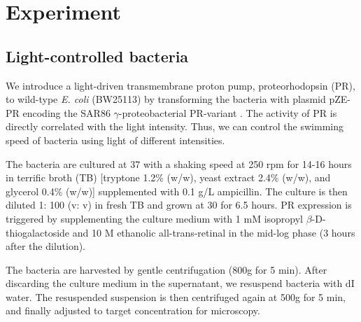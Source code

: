 \documentclass[twocolumn,aps,pre,amsmath,amssymb,floatfix,longbibliography]{revtex4-1}
\begin{document}


\section{Experiment}

\subsection{Light-controlled bacteria}
We introduce a light-driven transmembrane proton pump, proteorhodopsin (PR), to wild-type \textit{E. coli} (BW25113) by transforming the bacteria with plasmid pZE-PR encoding the SAR86 $\gamma$-proteobacterial PR-variant \cite{Walter2408}. The activity of PR is directly correlated with the light intensity. Thus, we can control the swimming speed of bacteria using light of different intensities.

The bacteria are cultured at 37 \textcelsius with a shaking speed at 250 rpm for 14-16 hours in terrific broth (TB) [tryptone 1.2\% (w/w), yeast extract 2.4\% (w/w), and glycerol 0.4\% (w/w)] supplemented with 0.1 g/L ampicillin. The culture is then diluted 1: 100 (v: v) in fresh TB and grown at 30 \textcelsius for 6.5 hours. PR expression is triggered by supplementing the culture medium with 1 mM isopropyl $\beta$-D-thiogalactoside and 10 \textmu M ethanolic all-trans-retinal in the mid-log phase (3 hours after the dilution).

The bacteria are harvested by gentle centrifugation (800g for 5 min). After discarding the culture medium in the supernatant, we resuspend bacteria with dI water. The resuspended suspension is then centrifuged again at 500g for 5 min, and finally adjusted to target concentration for microscopy.
\end{document}
